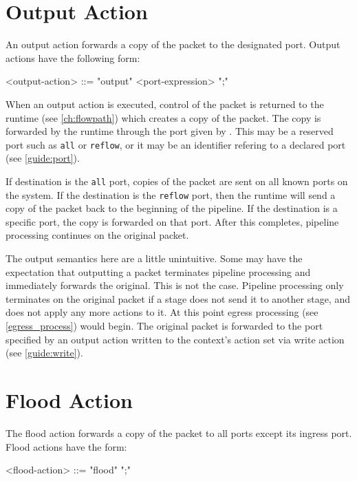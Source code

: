 \section{Output Action} \label{guide:output}

An output action forwards a copy of the packet to the designated port. Output actions have the following form:

\begin{minip}
\begin{grammar}
<output-action> ::= "output" <port-expression> ";"
\end{grammar}
\end{minip}

When an output action is executed, control of the packet is returned to the runtime (see \ref{ch:flowpath}) which creates a copy of the packet. The copy is forwarded by the runtime through the port given by . This may be a reserved port such as \texttt{all} or \texttt{reflow}, or it may be an identifier refering to a declared port (see \ref{guide:port}).

If destination is the \texttt{all} port, copies of the packet are sent on all known ports on the system. If the destination is the \texttt{reflow} port, then the runtime will send a copy of the packet back to the beginning of the pipeline. If the destination is a specific port, the copy is forwarded on that port. After this completes, pipeline processing continues on the original packet.

The output semantics here are a little unintuitive. Some may have the expectation that outputting a packet terminates pipeline processing and immediately forwards the original. This is not the case. Pipeline processing only terminates on the original packet if a stage does not send it to another stage, and does not apply any more actions to it. At this point egress processing (see \ref{egress_process}) would begin. The original packet is forwarded to the port specified by an output action written to the context's action set via write action (see \ref{guide:write}).

\section{Flood Action} \label{guide:flood}

The flood action forwards a copy of the packet to all ports except its ingress port. Flood actions have the form:

\begin{minip}
\begin{grammar}
<flood-action> ::= "flood" ";"
\end{grammar}
\end{minip}

